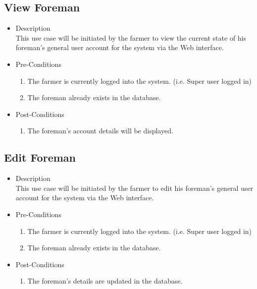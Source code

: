 \documentclass[11pt,fleqn]{book} %
\begin{document}
		\subsection{View Foreman}
		\begin{itemize}
			\item Description\\
			This use case will be initiated by the farmer to view the current state of his foreman’s general user account for the system via the Web interface.
			\item Pre-Conditions
			\begin{enumerate}
				\item The farmer is currently logged into the system. (i.e. Super user logged in)
				\item The foreman already exists in the database.					
			\end{enumerate}
			\item Post-Conditions
			\begin{enumerate}
				\item The foreman’s account details will be displayed.
			\end{enumerate}
		\end{itemize}
		
		\subsection{Edit Foreman}
		\begin{itemize}
			\item Description\\
			This use case will be initiated by the farmer to edit his foreman’s general user account for the system via the Web interface.
			\item Pre-Conditions
			\begin{enumerate}
				\item The farmer is currently logged into the system. (i.e. Super user logged in)
				\item The foreman already exists in the database.					
			\end{enumerate}
			\item Post-Conditions
			\begin{enumerate}
				\item The foreman’s details are updated in the database.
			\end{enumerate}
		\end{itemize}
		
\end{document}
